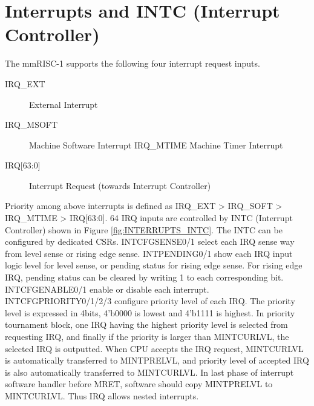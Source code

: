 \section{Interrupts and INTC (Interrupt Controller)}

The mmRISC-1 supports the following four interrupt request inputs. 

\begin{description}
    \item[IRQ\_EXT] External Interrupt
    \item[IRQ\_MSOFT] Machine Software Interrupt IRQ\_MTIME Machine Timer Interrupt
    \item[{IRQ[63:0]}] Interrupt Request (towards Interrupt Controller)
\end{description}

Priority among above interrupts is defined as IRQ\_EXT > IRQ\_SOFT > IRQ\_MTIME > IRQ[63:0].
64 IRQ inputs are controlled by INTC (Interrupt Controller) shown in Figure \ref{fig:INTERRUPTS_INTC}. The INTC can be configured by dedicated CSRs. INTCFGSENSE0/1 select each IRQ sense way from level sense or rising edge sense. INTPENDING0/1 show each IRQ input logic level for level sense, or pending status for rising edge sense. For rising edge IRQ, pending status can be cleared by writing 1 to each corresponding bit. INTCFGENABLE0/1 enable or disable each interrupt.\\

INTCFGPRIORITY0/1/2/3 configure priority level of each IRQ. The priority level is expressed in 4bits, 4’b0000 is lowest and 4’b1111 is highest. In priority tournament block, one IRQ having the highest priority level is selected from requesting IRQ, and finally if the priority is larger than MINTCURLVL, the selected IRQ is outputted. When CPU accepts the IRQ request, MINTCURLVL is automatically transferred to MINTPRELVL, and priority level of accepted IRQ is also automatically transferred to MINTCURLVL. In last phase of interrupt software handler before MRET, software should copy MINTPRELVL to MINTCURLVL. Thus IRQ allows nested interrupts.

